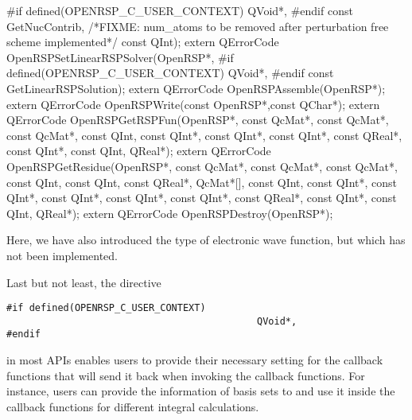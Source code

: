 #if defined(OPENRSP_C_USER_CONTEXT)
                                        QVoid*,
#endif 
                                        const GetNucContrib,
/*FIXME: num_atoms to be removed after perturbation free scheme implemented*/
                                        const QInt);
extern QErrorCode OpenRSPSetLinearRSPSolver(OpenRSP*,
#if defined(OPENRSP_C_USER_CONTEXT)
                                            QVoid*,
#endif
                                            const GetLinearRSPSolution);
extern QErrorCode OpenRSPAssemble(OpenRSP*);
extern QErrorCode OpenRSPWrite(const OpenRSP*,const QChar*);
extern QErrorCode OpenRSPGetRSPFun(OpenRSP*,
                                   const QcMat*,
                                   const QcMat*,
                                   const QcMat*,
                                   const QInt,
                                   const QInt*,
                                   const QInt*,
                                   const QInt*,
                                   const QReal*,
                                   const QInt*,
                                   const QInt,
                                   QReal*);
extern QErrorCode OpenRSPGetResidue(OpenRSP*,
                                    const QcMat*,
                                    const QcMat*,
                                    const QcMat*,
                                    const QInt,
                                    const QInt,
                                    const QReal*,
                                    QcMat*[],
                                    const QInt,
                                    const QInt*,
                                    const QInt*,
                                    const QInt*,
                                    const QInt*,
                                    const QInt*,
                                    const QReal*,
                                    const QInt*,
                                    const QInt,
                                    QReal*);
extern QErrorCode OpenRSPDestroy(OpenRSP*);

\nwendcode{}Here, we have also introduced the type of electronic wave function, but which
has not been implemented.

Last but not least, the directive
\begin{Verbatim}
#if defined(OPENRSP_C_USER_CONTEXT)
                                            QVoid*,
#endif
\end{Verbatim}
in most \LibName APIs enables users to provide their necessary setting for the
callback functions that \LibName will send it back when invoking the callback
functions. For instance, users can provide the information of basis sets to
\LibName and use it inside the callback functions for different integral
calculations.

